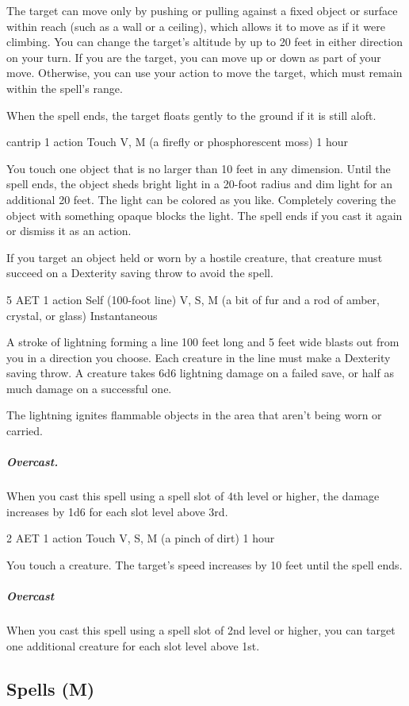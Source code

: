 The target can move only by pushing or pulling against a fixed object or surface within reach (such as a wall or a ceiling), which allows it to move as if it were climbing. You can change the target's altitude by up to 20 feet in either direction on your turn. If you are the target, you can move up or down as part of your move. Otherwise, you can use your action to move the target, which must remain within the spell's range.

When the spell ends, the target floats gently to the ground if it is still aloft.

\label{spell:light}
{cantrip}
{1 action}
{Touch}
{V, M (a firefly or phosphorescent moss)}
{1 hour}

You touch one object that is no larger than 10 feet in any dimension. Until the spell ends, the object sheds bright light in a 20-foot radius and dim light for an additional 20 feet. The light can be colored as you like. Completely covering the object with something opaque blocks the light. The spell ends if you cast it again or dismiss it as an action.

If you target an object held or worn by a hostile creature, that creature must succeed on a Dexterity saving throw to avoid the spell.

\label{spell:lightning-bolt}
{5 AET}
{1 action}
{Self (100-foot line)}
{V, S, M (a bit of fur and a rod of amber, crystal, or glass)}
{Instantaneous}

A stroke of lightning forming a line 100 feet long and 5 feet wide blasts out from you in a direction you choose. Each creature in the line must make a Dexterity saving throw. A creature takes 6d6 lightning damage on a failed save, or half as much damage on a successful one.

The lightning ignites flammable objects in the area that aren't being worn or carried.
\subparagraph*{Overcast.}When you cast this spell using a spell slot of 4th level or higher, the damage increases by 1d6 for each slot level above 3rd.

\label{spell:longstrider}
{2 AET}
{1 action}
{Touch}
{V, S, M (a pinch of dirt)}
{1 hour}

You touch a creature. The target's speed increases by 10 feet until the spell ends.
\subparagraph*{Overcast} When you cast this spell using a spell slot of 2nd level or higher, you can target one additional creature for each slot level above 1st.

\subsection{Spells (M)}

